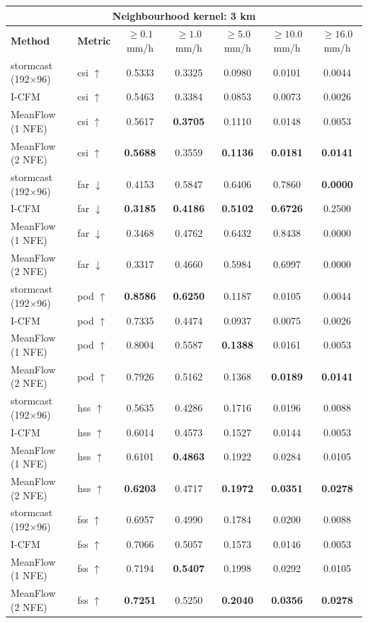 \documentclass[border=10pt]{standalone}
\begin{document}
\begin{tabular}{llccccc}
\toprule
\multicolumn{7}{c}{\textbf{Neighbourhood kernel: 3 km}} \\
\midrule
\textbf{Method} & \textbf{Metric} & $\geq 0.1$ mm/h & $\geq 1.0$ mm/h & $\geq 5.0$ mm/h & $\geq 10.0$ mm/h & $\geq 16.0$ mm/h \\
\midrule
stormcast (192$\times$96) & csi $\uparrow$ & 0.5333 & 0.3325 & 0.0980 & 0.0101 & 0.0044 \\
I-CFM & csi $\uparrow$ & 0.5463 & 0.3384 & 0.0853 & 0.0073 & 0.0026 \\
MeanFlow (1 NFE) & csi $\uparrow$ & 0.5617 & \textbf{0.3705} & 0.1110 & 0.0148 & 0.0053 \\
MeanFlow (2 NFE) & csi $\uparrow$ & \textbf{0.5688} & 0.3559 & \textbf{0.1136} & \textbf{0.0181} & \textbf{0.0141} \\
\midrule
stormcast (192$\times$96) & far $\downarrow$ & 0.4153 & 0.5847 & 0.6406 & 0.7860 & \textbf{0.0000} \\
I-CFM & far $\downarrow$ & \textbf{0.3185} & \textbf{0.4186} & \textbf{0.5102} & \textbf{0.6726} & 0.2500 \\
MeanFlow (1 NFE) & far $\downarrow$ & 0.3468 & 0.4762 & 0.6432 & 0.8438 & 0.0000 \\
MeanFlow (2 NFE) & far $\downarrow$ & 0.3317 & 0.4660 & 0.5984 & 0.6997 & 0.0000 \\
\midrule
stormcast (192$\times$96) & pod $\uparrow$ & \textbf{0.8586} & \textbf{0.6250} & 0.1187 & 0.0105 & 0.0044 \\
I-CFM & pod $\uparrow$ & 0.7335 & 0.4474 & 0.0937 & 0.0075 & 0.0026 \\
MeanFlow (1 NFE) & pod $\uparrow$ & 0.8004 & 0.5587 & \textbf{0.1388} & 0.0161 & 0.0053 \\
MeanFlow (2 NFE) & pod $\uparrow$ & 0.7926 & 0.5162 & 0.1368 & \textbf{0.0189} & \textbf{0.0141} \\
\midrule
stormcast (192$\times$96) & hss $\uparrow$ & 0.5635 & 0.4286 & 0.1716 & 0.0196 & 0.0088 \\
I-CFM & hss $\uparrow$ & 0.6014 & 0.4573 & 0.1527 & 0.0144 & 0.0053 \\
MeanFlow (1 NFE) & hss $\uparrow$ & 0.6101 & \textbf{0.4863} & 0.1922 & 0.0284 & 0.0105 \\
MeanFlow (2 NFE) & hss $\uparrow$ & \textbf{0.6203} & 0.4717 & \textbf{0.1972} & \textbf{0.0351} & \textbf{0.0278} \\
\midrule
stormcast (192$\times$96) & fss $\uparrow$ & 0.6957 & 0.4990 & 0.1784 & 0.0200 & 0.0088 \\
I-CFM & fss $\uparrow$ & 0.7066 & 0.5057 & 0.1573 & 0.0146 & 0.0053 \\
MeanFlow (1 NFE) & fss $\uparrow$ & 0.7194 & \textbf{0.5407} & 0.1998 & 0.0292 & 0.0105 \\
MeanFlow (2 NFE) & fss $\uparrow$ & \textbf{0.7251} & 0.5250 & \textbf{0.2040} & \textbf{0.0356} & \textbf{0.0278} \\
\bottomrule
\end{tabular}
\end{document}
